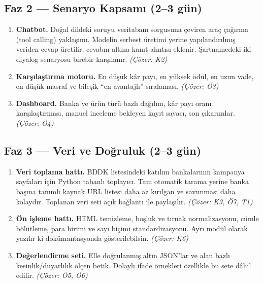 \documentclass[11pt,a4paper]{article}
\begin{document}
\subsection{Faz 2 --- Senaryo Kapsamı (2--3 gün)}

\begin{enumerate}[leftmargin=1.2cm,itemsep=3pt]
  \item \textbf{Chatbot.} Doğal dildeki soruyu veritabanı sorgusuna çeviren
        araç çağırma (tool calling) yaklaşımı. Modelin serbest üretimi yerine
        yapılandırılmış veriden cevap üretilir; cevabın altına kanıt alıntısı
        eklenir. Şartnamedeki iki diyalog senaryosu birebir karşılanır.
        \emph{(Çözer: K2)}
  \item \textbf{Karşılaştırma motoru.} En düşük kâr payı, en yüksek ödül, en uzun
        vade, en düşük masraf ve bileşik ``en avantajlı'' sıralaması.
        \emph{(Çözer: Ö3)}
  \item \textbf{Dashboard.} Banka ve ürün türü bazlı dağılım, kâr payı oranı
        karşılaştırması, manuel inceleme bekleyen kayıt sayacı, son çıkarımlar.
        \emph{(Çözer: Ö4)}
\end{enumerate}

\subsection{Faz 3 --- Veri ve Doğruluk (2--3 gün)}

\begin{enumerate}[leftmargin=1.2cm,itemsep=3pt]
  \item \textbf{Veri toplama hattı.} BDDK listesindeki katılım bankalarının kampanya
        sayfaları için Python tabanlı toplayıcı. Tam otomatik tarama yerine banka
        başına tanımlı kaynak URL listesi daha az kırılgan ve savunması daha
        kolaydır. Toplanan veri seti açık bağlantı ile paylaşılır.
        \emph{(Çözer: K3, Ö7, T1)}
  \item \textbf{Ön işleme hattı.} HTML temizleme, boşluk ve tırnak normalizasyonu,
        cümle bölütleme, para birimi ve sayı biçimi standardizasyonu. Ayrı modül
        olarak yazılır ki dokümantasyonda gösterilebilsin. \emph{(Çözer: K6)}
  \item \textbf{Değerlendirme seti.} Elle doğrulanmış altın JSON'lar ve alan bazlı
        kesinlik/duyarlılık ölçen betik. Dolaylı ifade örnekleri özellikle bu sete
        dâhil edilir. \emph{(Çözer: Ö5, Ö6)}
\end{enumerate}
\end{document}
